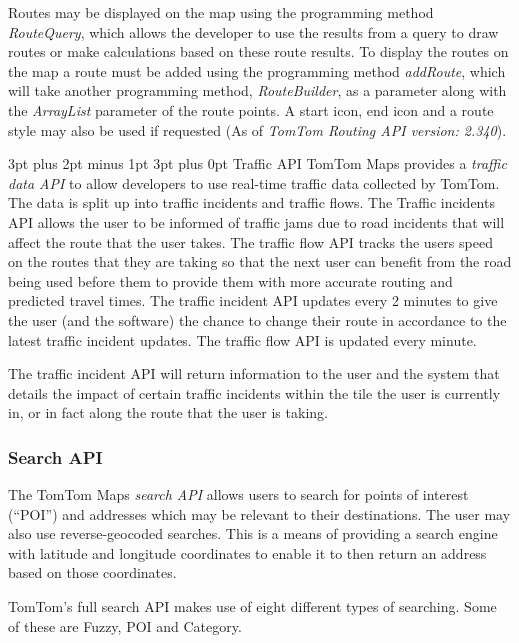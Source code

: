 \documentclass[12pt,a4paper]{article}
\makeatletter
\renewcommand\subsection{\@startsection {subsection}{1}{0mm} %
                               {3pt plus 2pt minus 1pt} %
                               {3pt plus 0pt} %
                               {\normalfont\bfseries}}
\makeatother
\begin{document}
Routes may be displayed on the map using the programming method \textit{RouteQuery}, which allows the developer to use the results from a query to draw routes or make calculations based on these route results. To display the routes on the map a route must be added using the programming method \textit{addRoute}, which will take another programming method, \textit{RouteBuilder}, as a parameter along with the \textit{ArrayList} parameter of the route points. A start icon, end icon and a route style may also be used if requested (As of \textit{TomTom Routing API version: 2.340}).


\subsection{Traffic API}
TomTom Maps provides a \textit{traffic data API} to allow developers to use real-time traffic data collected by TomTom. The data is split up into traffic incidents and traffic flows. The Traffic incidents API allows the user to be informed of traffic jams due to road incidents that will affect the route that the user takes. The traffic flow API tracks the users speed on the routes that they are taking so that the next user can benefit from the road being used before them to provide them with more accurate routing and predicted travel times. The traffic incident API updates every 2 minutes to give the user (and the software) the chance to change their route in accordance to the latest traffic incident updates. The traffic flow API is updated every minute.

The traffic incident API will return information to the user and the system that details the impact of certain traffic incidents within the tile the user is currently in, or in fact along the route that the user is taking. 

\subsubsection{Search API}
The TomTom Maps \textit{search API} allows users to search for points of interest (\enquote{POI}) and addresses which may be relevant to their destinations. The user may also use reverse-geocoded searches. This is a means of providing a search engine with latitude and longitude coordinates to enable it to then return an address based on those coordinates.

TomTom's full search API makes use of eight different types of searching. Some of these are Fuzzy, POI and Category.
\end{document}
